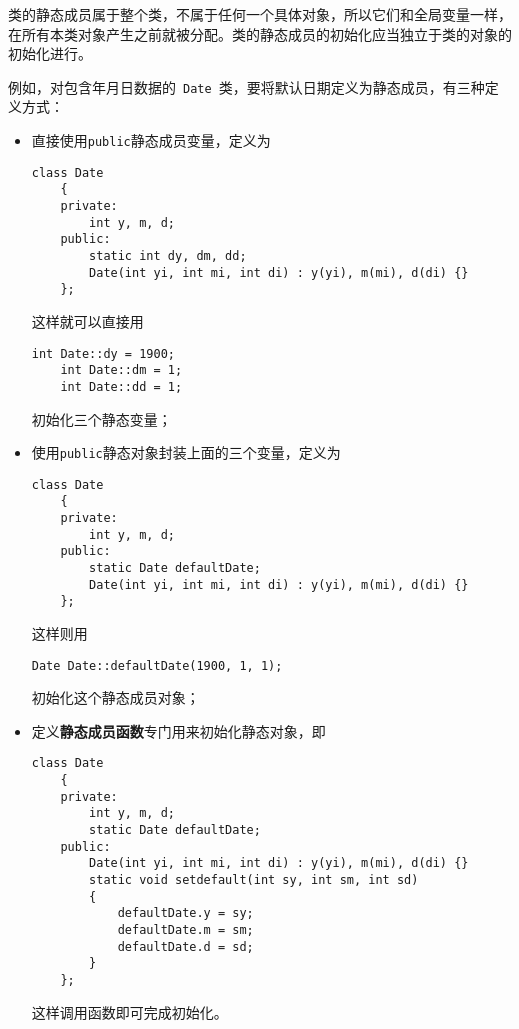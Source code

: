 \documentclass[10pt, a4paper, oneside, fontset=none]{ctexart}
\theoremstyle{plain}
\theoremstyle{definition}
\newcommand{\colors}[1]{\color{#1!75!black}}
\newcommand{\tboba}[1]{\textbf{\kai\color{bali!75!black}#1}}
\begin{document}
类的静态成员属于整个类，不属于任何一个具体对象，所以它们和全局变量一样，在所有本类对象产生之前就被分配。类的静态成员的初始化应当独立于类的对象的初始化进行。

例如，对包含年月日数据的~\lstinline[moreemph={Date}, emphstyle=\colors{qinglv}, moreemph={[2]{length, str, s}}, emphstyle={[2]\it\ttfamily}, ]|Date|~类，要将默认日期定义为静态成员，有三种定义方式：
\begin{itemize}
\item 直接使用\texttt{public}静态成员变量，定义为
\begin{lstlisting}[xleftmargin=1em,
	moreemph={Date}, emphstyle=\colors{qinglv}, %
	moreemph={[2]{y, m, d, dy, dm, dd, yi, mi, di}}, emphstyle={[2]\it\ttfamily}, ]
	class Date
	{
	private:
		int y, m, d;
	public:
		static int dy, dm, dd;
		Date(int yi, int mi, int di) : y(yi), m(mi), d(di) {}
	};
\end{lstlisting}
这样就可以直接用
\begin{lstlisting}[xleftmargin=1em,
	moreemph={Date}, emphstyle=\colors{qinglv}, %
	moreemph={[2]{y, m, d, dy, dm, dd, yi, mi, di}}, emphstyle={[2]\it\ttfamily}, ]
	int Date::dy = 1900;
	int Date::dm = 1;
	int Date::dd = 1;
\end{lstlisting}
初始化三个静态变量；
\item 使用\texttt{public}静态对象封装上面的三个变量，定义为
\begin{lstlisting}[xleftmargin=1em,
	moreemph={Date}, emphstyle=\colors{qinglv}, %
	moreemph={[2]{y, m, d, dy, dm, dd, yi, mi, di, defaultDate}}, emphstyle={[2]\it\ttfamily}, ]
	class Date
	{
	private:
		int y, m, d;
	public:
		static Date defaultDate;
		Date(int yi, int mi, int di) : y(yi), m(mi), d(di) {}
	};
\end{lstlisting}
这样则用
\begin{lstlisting}[xleftmargin=1em,
	moreemph={Date}, emphstyle=\colors{qinglv}, %
	moreemph={[2]{y, m, d, dy, dm, dd, yi, mi, di, defaultDate}}, emphstyle={[2]\it\ttfamily}, ]
	Date Date::defaultDate(1900, 1, 1);
\end{lstlisting}
初始化这个静态成员对象；
\item 定义\tboba{静态成员函数}专门用来初始化静态对象，即 
\begin{lstlisting}[xleftmargin=1em,
	moreemph={Date}, emphstyle=\colors{qinglv}, %
	moreemph={[2]{y, m, d, dy, dm, dd, yi, mi, di, sy, sm, sd, defaultDate}}, emphstyle={[2]\it\ttfamily}, ]
	class Date
	{
	private:
		int y, m, d;
		static Date defaultDate;
	public:
		Date(int yi, int mi, int di) : y(yi), m(mi), d(di) {}
		static void setdefault(int sy, int sm, int sd)
		{
			defaultDate.y = sy;
			defaultDate.m = sm;
			defaultDate.d = sd;
		}
	};
\end{lstlisting}
这样调用函数即可完成初始化。
\end{itemize}
\end{document}
